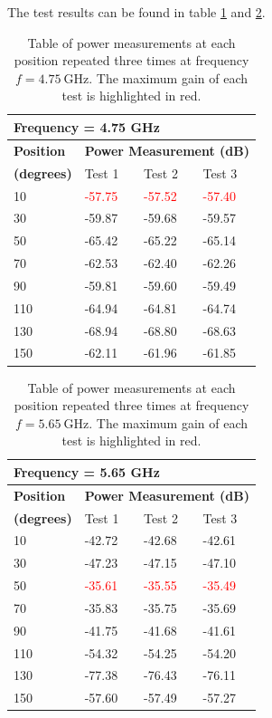 The test results can be found in table \ref{tab:a2_4a} and \ref{tab:a2_4b}.
\begin{table}[H]
    \centering
    \begin{tabular}{l|l|l|l}
        \multicolumn{4}{l}{\textbf{Frequency = 4.75 GHz}}         \\
        \hline
        \textbf{Position} & \multicolumn{3}{l}{\textbf{Power Measurement (dB)}} \\
        \textbf{(degrees)}  & Test 1    & Test 2  & Test 3  \\
        \hline
        \hline
        10      & \textcolor{red}{-57.75}    & \textcolor{red}{-57.52}    & \textcolor{red}{-57.40} \\
        30      & -59.87    & -59.68    & -59.57 \\
        50      & -65.42    & -65.22    & -65.14 \\
        70      & -62.53    & -62.40    & -62.26 \\
        90      & -59.81    & -59.60    & -59.49 \\
        110     & -64.94    & -64.81    & -64.74 \\
        130     & -68.94    & -68.80    & -68.63 \\
        150     & -62.11    & -61.96    & -61.85
        \end{tabular}
    \caption{Table of power measurements at each position repeated three times at frequency $f=\SI{4.75}{\giga\hertz}$. The maximum gain of each test is highlighted in red.}
    \label{tab:a2_4a}
\end{table}

\begin{table}[H]
    \centering
    \begin{tabular}{l|l|l|l}
        \multicolumn{4}{l}{\textbf{Frequency = 5.65 GHz}}         \\
        \hline
        \textbf{Position} & \multicolumn{3}{l}{\textbf{Power Measurement (dB)}} \\
        \textbf{(degrees)}  & Test 1    & Test 2  & Test 3  \\
        \hline
        \hline
        10      & -42.72    & -42.68    & -42.61 \\
        30      & -47.23    & -47.15    & -47.10 \\
        50      & \textcolor{red}{-35.61}    & \textcolor{red}{-35.55}    & \textcolor{red}{-35.49} \\
        70      & -35.83    & -35.75    & -35.69 \\
        90      & -41.75    & -41.68    & -41.61 \\
        110     & -54.32    & -54.25    & -54.20 \\
        130     & -77.38    & -76.43    & -76.11 \\
        150     & -57.60    & -57.49    & -57.27
        \end{tabular}
    \caption{Table of power measurements at each position repeated three times at frequency $f=\SI{5.65}{\giga\hertz}$. The maximum gain of each test is highlighted in red.}
    \label{tab:a2_4b}
\end{table}

